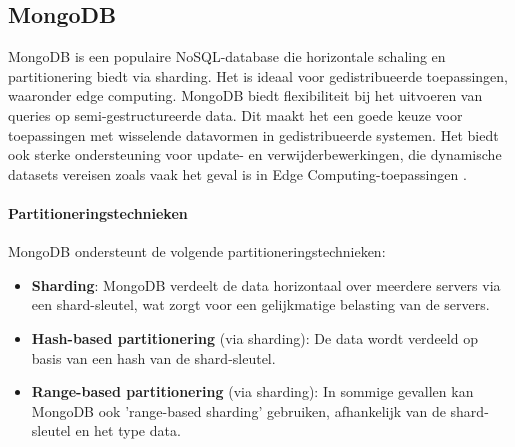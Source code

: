 \subsection{MongoDB}

MongoDB is een populaire NoSQL-database die horizontale schaling en partitionering biedt via sharding. Het is ideaal voor gedistribueerde toepassingen, waaronder edge computing. MongoDB biedt flexibiliteit bij het uitvoeren van queries op semi-gestructureerde data. Dit maakt het een goede keuze voor toepassingen met wisselende datavormen in gedistribueerde systemen. Het biedt ook sterke ondersteuning voor update- en verwijderbewerkingen, die dynamische datasets vereisen zoals vaak het geval is in Edge Computing-toepassingen \autocite{MongoDBDocumentation}.

\paragraph{Partitioneringstechnieken}  
MongoDB ondersteunt de volgende partitioneringstechnieken:
\begin{itemize}
    \item \textbf{Sharding}: MongoDB verdeelt de data horizontaal over meerdere servers via een shard-sleutel, wat zorgt voor een gelijkmatige belasting van de servers.
    \item \textbf{Hash-based partitionering} (via sharding): De data wordt verdeeld op basis van een hash van de shard-sleutel.
    \item \textbf{Range-based partitionering} (via sharding): In sommige gevallen kan MongoDB ook 'range-based sharding' gebruiken, afhankelijk van de shard-sleutel en het type data.
\end{itemize}

